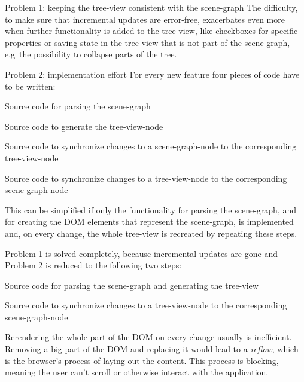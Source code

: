 \begin{description*}
  \item[Problem 1: keeping the tree-view consistent with the scene-graph]
    The difficulty, to make sure that incremental updates are error-free,
    exacerbates even more when further functionality is
    added to the tree-view,  like checkboxes for
    specific properties or saving state in the tree-view that is not part of
    the scene-graph, e.g~the possibility to collapse parts of the tree.
  \item[Problem 2: implementation effort]
    For every new feature four pieces of code have to be written:
    \begin{enumerate*}
      \item Source code for parsing the scene-graph
      \item Source code to generate the tree-view-node
      \item Source code to synchronize changes to a scene-graph-node to the corresponding tree-view-node
      \item Source code to synchronize changes to a tree-view-node to the corresponding scene-graph-node
    \end{enumerate*}
\end{description*}

This can be simplified if only the functionality for parsing the
scene-graph, and  for creating the \gls{DOM} elements that represent the scene-graph,
is implemented and, on every change, the whole tree-view is recreated by repeating these steps.

Problem 1 is solved completely, because incremental updates are gone and
Problem 2 is reduced to the following two steps:

\begin{enumerate*}
  \item Source code for parsing the scene-graph and generating the tree-view
  \item Source code to synchronize changes to a tree-view-node to the corresponding scene-graph-node
\end{enumerate*}

Rerendering the whole part of the \gls{DOM} on every change usually is inefficient. Removing a big part
of the \gls{DOM} and replacing it would lead to a \emph{reflow}, which is the browser's
process of laying out the content. This process is blocking, meaning the user can't
scroll or otherwise interact with the application. \cite{reflow}

